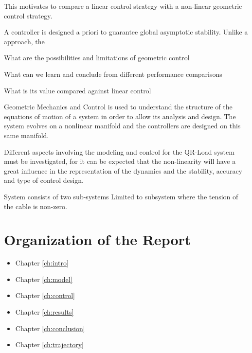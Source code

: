 

This motivates to compare a linear control strategy with a non-linear geometric control strategy.

A controller is designed a priori to guarantee global asymptotic stability. Unlike a  approach, the 

What are the possibilities and limitations of geometric control

What can we learn and conclude from different performance comparisons

What is its value compared against linear control

Geometric Mechanics and Control is used to understand the structure of the equations of motion of a system in order to allow its analysis and design. The system evolves on a nonlinear manifold and the controllers are designed on this same manifold.

Different aspects involving the modeling and control for the QR-Load system must be investigated, for it can be expected that the non-linearity will have a great influence in the representation of the dynamics and the stability, accuracy and type of control design.

System consists of two sub-systems
Limited to subsystem where the tension of the cable is non-zero. 

\section{Organization of the Report}

\begin{itemize}
\item Chapter \ref{ch:intro}
\item Chapter \ref{ch:model}
\item Chapter \ref{ch:control}
\item Chapter \ref{ch:results}
\item Chapter \ref{ch:conclusion}
\item Chapter \ref{ch:trajectory}
\end{itemize}
